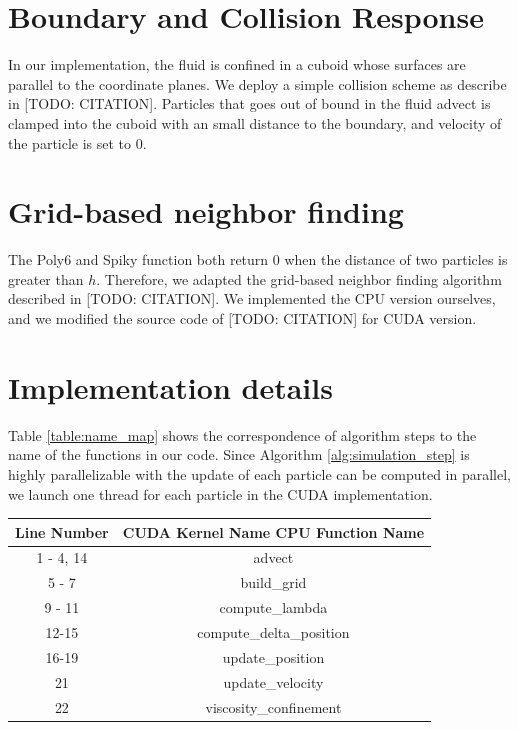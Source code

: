 \documentclass[sigconf]{acmart}
\begin{document}
\section{Boundary and Collision Response}
In our implementation, the fluid is confined in a cuboid whose surfaces are parallel to the coordinate planes. We deploy a simple collision scheme as describe in [TODO: CITATION]. Particles that goes out of bound in the fluid advect is clamped into the cuboid with an small distance to the boundary, and velocity of the particle is set to 0.

\section{Grid-based neighbor finding}
The Poly6 and Spiky function both return 0 when the distance of two particles is greater than $h$. Therefore, we adapted the grid-based neighbor finding algorithm described in [TODO: CITATION]. We implemented the CPU version ourselves, and we modified the source code of [TODO: CITATION] for CUDA version. 

\section{Implementation details}
Table \ref{table:name_map} shows the correspondence of algorithm steps to the name of the functions in our code. Since Algorithm \ref{alg:simulation_step} is highly parallelizable with the update of each particle can be computed in parallel, we launch one thread for each particle in the CUDA implementation.

\begin{center}
  \begin{tabular}{| c | c |}
    \hline
    Line Number & CUDA Kernel Name\/ CPU Function Name  \\
    \hline
    1 - 4, 14 & advect \\
    \hline
    5 - 7 & build\_grid \\
    \hline
    9 - 11 & compute\_lambda \\
    \hline
    12-15 & compute\_delta\_position \\
    \hline
    16-19 & update\_position \\
    \hline
    21 & update\_velocity \\
    \hline
    22 & viscosity\_confinement \\
    \hline
  \end{tabular}
\end{center}
\end{document}
